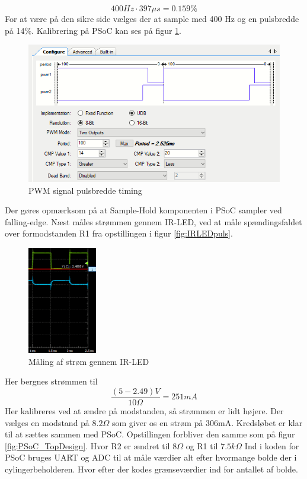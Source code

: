 $$400Hz\cdot 397\mu s=0.159\%$$
For at være på den sikre side vælges der at sample med 400 Hz og en pulsbredde på 14\%. Kalibrering på PSoC kan ses på figur \ref{fig:PWM_timing}.
\begin{figure}[H]
    \centering
    \includegraphics[width=1\textwidth]{Rapport/BallDispenser/BallCountSensor/graphics/PWM_timing.png}
    \caption{PWM signal pulsbredde timing}
    \label{fig:PWM_timing}
\end{figure}
Der gøres opmærksom på at Sample-Hold komponenten i PSoC sampler ved falling-edge. Næst måles strømmen gennem IR-LED, ved at måle spændingsfaldet over formodstanden R1 fra opstillingen i figur \ref{fig:IRLEDpuls}.
\begin{figure}[H]
    \centering
    \includegraphics[width=0.27\textwidth]{Rapport/BallDispenser/BallCountSensor/graphics/Maling2.png}
    \caption{Måling af strøm gennem IR-LED}
    \label{fig:Måling2_AD}
\end{figure}
Her bergnes strømmen til 
$$\frac{(5-2.49)V}{10\Omega}=251mA$$
Her kalibreres ved at ændre på modstanden, så strømmen er lidt højere. Der vælges en modstand på $8.2\Omega$ som giver os en strøm på 306mA.
Kredsløbet er klar til at sættes sammen med PSoC. Opstillingen forbliver den samme som på figur \ref{fig:PSoC_TopDesign}. Hvor R2 er ændret til $8\Omega$ og R1 til $7.5k\Omega$
Ind i koden for PSoC bruges UART og ADC til at måle værdier alt efter hvormange bolde der i cylingerbeholderen. Hvor efter der kodes grænseværdier ind for antallet af bolde.


